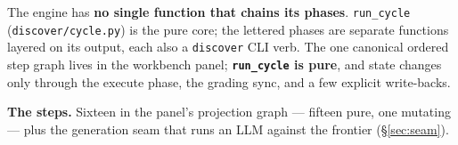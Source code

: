 \documentclass[11pt]{article}
\newcommand{\code}[1]{\texttt{\small #1}}
\begin{document}
\begin{center}
\end{center}

The engine has \textbf{no single function that chains its phases}. \code{run\_cycle}
(\code{discover/cycle.py}) is the pure core; the lettered phases are separate functions layered
on its output, each also a \code{discover} CLI verb. The one canonical ordered step graph lives
in the workbench panel; \textbf{\code{run\_cycle} is pure}, and state changes only through the
execute phase, the grading sync, and a few explicit write-backs.

\medskip
\noindent\textbf{The steps.} Sixteen in the panel's projection graph --- fifteen pure, one
mutating --- plus the generation seam that runs an LLM against the frontier (\S\ref{sec:seam}).
\end{document}
